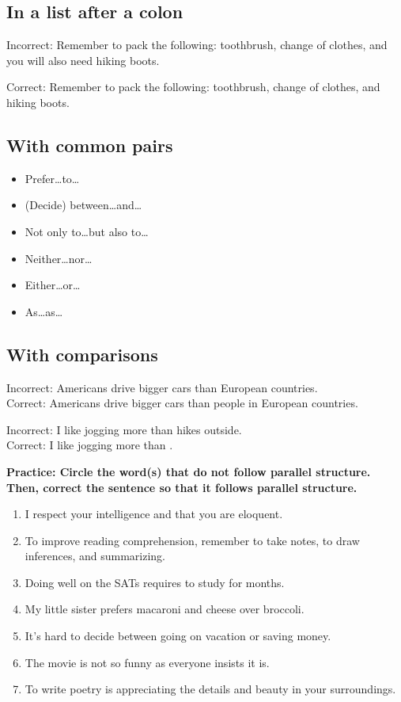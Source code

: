 \documentclass[12pt]{book}
\begin{document}
\subsection{In a list after a colon}
Incorrect:  Remember to pack the following: toothbrush, change of clothes, and you will also need hiking boots.

\bigskip
Correct:  Remember to pack the following: toothbrush, change of clothes, and hiking boots.

\subsection{With common pairs}
\begin{itemize}
\item{Prefer\ldots to\ldots}
\item{(Decide) between\ldots and\ldots}
\item{Not only to\ldots but also to\ldots}
\item{Neither\ldots nor\ldots}
\item{Either\ldots or\ldots}
\item{As\ldots as\ldots}
\end{itemize}

\subsection{With comparisons}

Incorrect: Americans drive bigger cars than European countries.\\
Correct:  Americans drive bigger cars than people in European countries.

\bigskip
Incorrect:  I like jogging more than hikes outside.\\
Correct: I like jogging more than \hrulefill.

\bigskip
\textbf{Practice: Circle the word(s) that do not follow parallel structure. Then, correct the sentence so that it follows parallel structure.}

\begin{enumerate}
\item{I respect your intelligence and that you are eloquent.}
\item{To improve reading comprehension, remember to take notes, to draw inferences, and summarizing.}
\item{Doing well on the SATs requires to study for months.}
\item{My little sister prefers macaroni and cheese over broccoli.}
\item{It's hard to decide between going on vacation or saving money.}
\item{The movie is not so funny as everyone insists it is.}
\item{To write poetry is appreciating the details and beauty in your surroundings.}
\end{enumerate}
\end{document}
